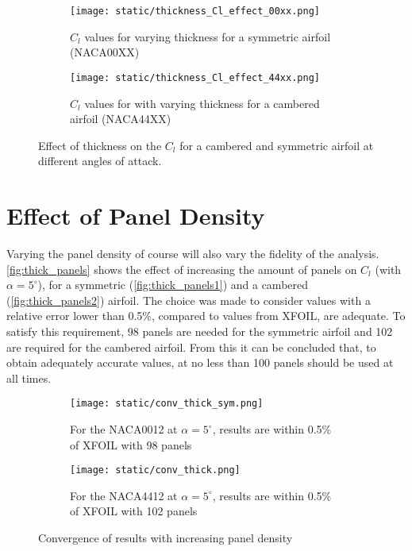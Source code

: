 \begin{figure}[h]
  \centering
  \begin{subfigure}{.5\textwidth}
    \centering
    \captionsetup{width=.8\linewidth}
    \texttt{[image: static/thickness\_Cl\_effect\_00xx.png]}
    \caption{\centering $C_l$ values for varying thickness for a symmetric airfoil (NACA00XX)}
    \label{fig:thickcl1}
  \end{subfigure}\hfill%
  \begin{subfigure}{.5\textwidth}
    \centering
    \captionsetup{width=.9\linewidth}
    \texttt{[image: static/thickness\_Cl\_effect\_44xx.png]}
    \caption{\centering $C_l$ values for with varying thickness for a cambered airfoil (NACA44XX)}
    \label{fig:thickcl2}
  \end{subfigure}
  \caption{\centering Effect of thickness on the $C_l$ for a cambered and symmetric airfoil at different angles of attack.}
  \label{fig:thickcl}
\end{figure}



\section{Effect of Panel Density}
\label{sec:panels}
Varying the panel density of course will also vary the fidelity of the analysis.
\autoref{fig:thick_panels} shows the effect of increasing the amount of panels
on $C_l$ (with $\alpha = 5^{\circ}$), for a symmetric (\autoref{fig:thick_panels1}) and a cambered
(\autoref{fig:thick_panels2}) airfoil. The choice was made to consider values
with a relative error lower than 0.5\%, compared to values from XFOIL, are
adequate. To satisfy this requirement, 98 panels are needed for the symmetric
airfoil and 102 are required for the cambered airfoil. From this it can be
concluded that, to obtain adequately accurate values, at no less than 100 panels
should be used at all times.

\begin{figure}[h]
  \centering
  \begin{subfigure}{.5\textwidth}
    \centering
    \captionsetup{width=.8\linewidth}
    \texttt{[image: static/conv\_thick\_sym.png]}
    \caption{For the NACA0012 at $\alpha = 5^{\circ}$, results are within 0.5\% of XFOIL with 98 panels}
    \label{fig:thick_panels1}
  \end{subfigure}%
  \begin{subfigure}{.5\textwidth}
    \centering
    \captionsetup{width=.8\linewidth}
    \texttt{[image: static/conv\_thick.png]}
    \caption{For the NACA4412 at $\alpha = 5^{\circ}$, results are within 0.5\% of XFOIL with 102 panels}
    \label{fig:thick_panels2}
  \end{subfigure}
  \caption{\centering Convergence of results with increasing panel density}
  \label{fig:thick_panels}
\end{figure}

